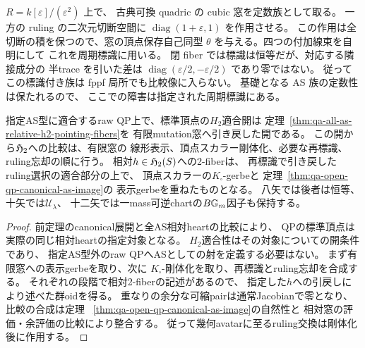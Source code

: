 \begin{example}[幾何点では比較像に入る周期標識]
$R=k[\varepsilon]/(\varepsilon^2)$ 上で、
古典可換 quadric の cubic 窓を定数族として取る。
一方の ruling の二次元切断空間に
$\operatorname{diag}(1+\varepsilon,1)$ を作用させる。
この作用は全切断の積を保つので、窓の頂点保存自己同型
$\theta$ を与える。四つの付加線束を自明にして
これを周期標識に用いる。
閉 fiber では標識は恒等だが、対応する隣接成分の
半trace を引いた差は
$\operatorname{diag}(\varepsilon/2,-\varepsilon/2)$ であり零ではない。
従ってこの標識付き族は fppf 局所でも比較像に入らない。
基礎となる AS 族の定数性は保たれるので、
ここでの障害は指定された周期標識にある。
\end{example}


\begin{corollary}[指定pointingを持つQPの比較図式]
\label{cor:qa-open-qp-h2-pointing-fibers}
指定AS型に適合するraw QP上で、標準頂点の$H_2$適合開は
定理~\ref{thm:qa-all-as-relative-h2-pointing-fibers}を
有限mutation窓へ引き戻した開である。
この開から$\mathfrak H_2$への比較は、有限窓の
線形表示、頂点スカラー剛体化、必要な再標識、
ruling忘却の順に行う。
相対$h\in\mathfrak H_2(S)$への2-fiberは、
再標識で引き戻したruling選択の適合部分の上で、
頂点スカラーの$K_\square$-gerbeと
定理~\ref{thm:qa-open-qp-canonical-as-image}の
表示gerbeを重ねたものとなる。
八矢では後者は恒等、十矢では$\mathcal U_\lambda$、
十二矢では一mass可逆chartの$B\mathbb G_m$因子も保持する。
\end{corollary}
\begin{proof}
前定理のcanonical展開と全AS相対heartの比較により、
QPの標準頂点は実際の同じ相対heartの指定対象となる。
$H_2$適合性はその対象についての開条件であり、
指定AS型外のraw QPへASとしての射を定義する必要はない。
まず有限窓への表示gerbeを取り、次に
$K_\square$-剛体化を取り、再標識とruling忘却を合成する。
それぞれの段階で相対2-fiberの記述があるので、
指定した$h$への引戻しにより述べた群oidを得る。
重なりの余分な可縮pairは通常Jacobianで零となり、
比較の合成は定理~
\ref{thm:qa-open-qp-canonical-as-image}の自然性と
相対窓の評価・余評価の比較により整合する。
従って幾何avatarに至るruling交換は剛体化後に作用する。
\end{proof}
